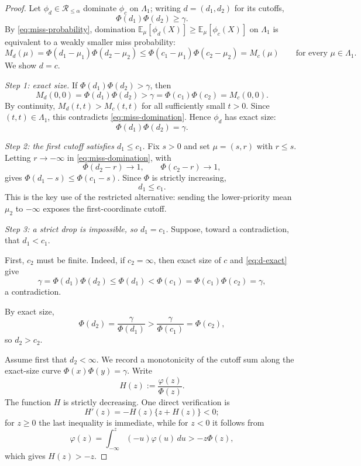 \documentclass[12pt]{article}
\theoremstyle{definition}
\theoremstyle{remark}
\newcommand{\E}{\mathbb E}
\newcommand{\phidens}{\varphi}
\newcommand{\phitest}{\phi}
\newcommand{\gammalev}{\gamma}
\begin{document}
\begin{proof}
Let $\phitest_d\in\mathcal R_{\le\alpha}$ dominate $\phitest_c$ on $\Lambda_1$; writing $d=(d_1,d_2)$ for its cutoffs,
\begin{equation}\label{eq:d-level}
\Phi(d_1)\Phi(d_2)\ge\gammalev.
\end{equation}
By \eqref{eq:miss-probability}, domination $\E_\mu[\phitest_d(X)]\ge \E_\mu[\phitest_c(X)]$ on $\Lambda_1$ is equivalent to a weakly smaller miss probability:
\begin{equation}\label{eq:miss-domination}
M_d(\mu)=\Phi(d_1-\mu_1)\Phi(d_2-\mu_2)
\le
\Phi(c_1-\mu_1)\Phi(c_2-\mu_2)=M_c(\mu)
\qquad\text{for every }\mu\in\Lambda_1.
\end{equation}
We show $d=c$.

\emph{Step 1: exact size.}
If $\Phi(d_1)\Phi(d_2)>\gammalev$, then
\[
M_d(0,0)=\Phi(d_1)\Phi(d_2)
>
\gammalev
=
\Phi(c_1)\Phi(c_2)=M_c(0,0).
\]
By continuity, $M_d(t,t)>M_c(t,t)$ for all sufficiently small $t>0$. Since $(t,t)\in\Lambda_1$, this contradicts \eqref{eq:miss-domination}. Hence $\phitest_d$ has exact size:
\begin{equation}\label{eq:d-exact}
\Phi(d_1)\Phi(d_2)=\gammalev.
\end{equation}

\emph{Step 2: the first cutoff satisfies $d_1\le c_1$.}
Fix $s>0$ and set $\mu=(s,r)$ with $r\le s$. Letting $r\to-\infty$ in \eqref{eq:miss-domination}, with
\[
\Phi(d_2-r)\to1,
\qquad
\Phi(c_2-r)\to1,
\]
gives $\Phi(d_1-s)\le\Phi(c_1-s)$. Since $\Phi$ is strictly increasing,
\begin{equation}\label{eq:first-cutoff-order}
d_1\le c_1.
\end{equation}
This is the key use of the restricted alternative: sending the lower-priority mean $\mu_2$ to $-\infty$ exposes the first-coordinate cutoff.

\emph{Step 3: a strict drop is impossible, so $d_1=c_1$.}
Suppose, toward a contradiction, that $d_1<c_1$.

First, $c_2$ must be finite. Indeed, if $c_2=\infty$, then exact size of $c$ and \eqref{eq:d-exact} give
\[
\gammalev
=\Phi(d_1)\Phi(d_2)
\le \Phi(d_1)
<\Phi(c_1)
=\Phi(c_1)\Phi(c_2)
=\gammalev,
\]
a contradiction.

By exact size,
\[
\Phi(d_2)
=
\frac{\gammalev}{\Phi(d_1)}
>
\frac{\gammalev}{\Phi(c_1)}
=
\Phi(c_2),
\]
so $d_2>c_2$.

Assume first that $d_2<\infty$. We record a monotonicity of the cutoff sum along the exact-size curve $\Phi(x)\Phi(y)=\gammalev$. Write
\[
H(z):=\frac{\phidens(z)}{\Phi(z)}.
\]
The function $H$ is strictly decreasing. One direct verification is
\[
H'(z)=-H(z)\{z+H(z)\}<0;
\]
for $z\ge0$ the last inequality is immediate, while for $z<0$ it follows from
\[
\phidens(z)=\int_{-\infty}^{z}(-u)\phidens(u)\,du>-z\Phi(z),
\]
which gives $H(z)>-z$.


\end{proof}
\end{document}
